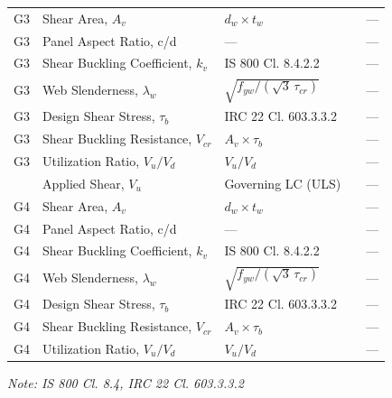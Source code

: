 \documentclass[12pt,a4paper]{report}
\numberwithin{table}{chapter}
\numberwithin{figure}{chapter}
\begin{document}
\begin{longtable}{|C{2.5cm}|C{3.5cm}|C{3.5cm}|>{\centering\arraybackslash}p{4.2cm}|C{1.8cm}|}
G3 & Shear Area, $A_v$ & $d_w \times t_w$ &  & --- \\[6pt]
G3 & Panel Aspect Ratio, c/d & --- &  & --- \\[6pt]
G3 & Shear Buckling Coefficient, $k_v$ & IS 800 Cl. 8.4.2.2 &  & --- \\[6pt]
G3 & Web Slenderness, $\lambda_w$ & $\sqrt{f_{yw}/(\sqrt{3}\,\tau_{cr})}$ &  & --- \\[6pt]
G3 & Design Shear Stress, $\tau_b$ & IRC 22 Cl. 603.3.3.2 &  & --- \\[6pt]
G3 & Shear Buckling Resistance, $V_{cr}$ & $A_v \times \tau_b$ &  & --- \\[6pt]
G3 & Utilization Ratio, $V_u / V_d$ & $V_u / V_d$ &  & --- \\[6pt]
\hline
{} & Applied Shear, $V_u$ & Governing LC (ULS) &  & --- \\[6pt]
G4 & Shear Area, $A_v$ & $d_w \times t_w$ &  & --- \\[6pt]
G4 & Panel Aspect Ratio, c/d & --- &  & --- \\[6pt]
G4 & Shear Buckling Coefficient, $k_v$ & IS 800 Cl. 8.4.2.2 &  & --- \\[6pt]
G4 & Web Slenderness, $\lambda_w$ & $\sqrt{f_{yw}/(\sqrt{3}\,\tau_{cr})}$ &  & --- \\[6pt]
G4 & Design Shear Stress, $\tau_b$ & IRC 22 Cl. 603.3.3.2 &  & --- \\[6pt]
G4 & Shear Buckling Resistance, $V_{cr}$ & $A_v \times \tau_b$ &  & --- \\[6pt]
G4 & Utilization Ratio, $V_u / V_d$ & $V_u / V_d$ &  & --- \\[6pt]
\hline
\end{longtable}
\noindent\textit{Note: IS 800 Cl. 8.4, IRC 22 Cl. 603.3.3.2}
\end{document}
